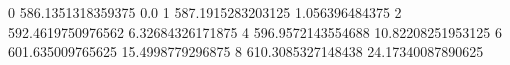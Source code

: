 0 586.1351318359375 0.0
1 587.1915283203125 1.056396484375
2 592.4619750976562 6.32684326171875
4 596.9572143554688 10.82208251953125
6 601.635009765625 15.4998779296875
8 610.3085327148438 24.17340087890625
